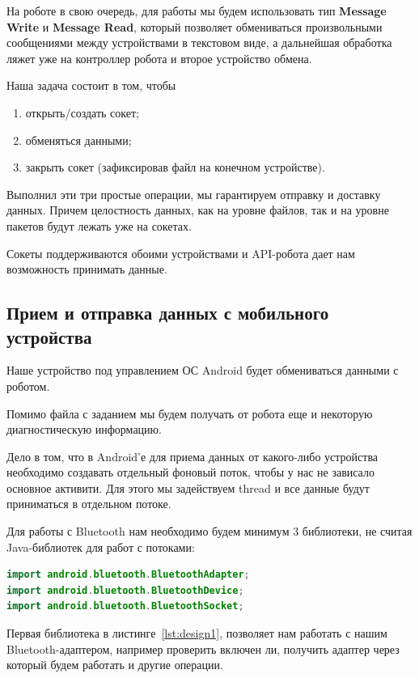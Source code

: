 На роботе в свою очередь, для работы мы будем использовать тип \textbf{Message Write} и \textbf{Message Read}, который позволяет обмениваться произвольными сообщениями между устройствами в текстовом виде, а дальнейшая обработка ляжет уже на контроллер робота и второе устройство обмена.

Наша задача состоит в том, чтобы 
\begin{enumerate}
  \item открыть/создать сокет;
  \item обменяться данными;
  \item закрыть сокет (зафиксировав файл на конечном устройстве).
\end{enumerate}

Выполнил эти три простые операции, мы гарантируем отправку и доставку данных. Причем целостность данных, как на уровне файлов, так и на уровне пакетов будут лежать уже на сокетах.

Сокеты поддерживаются обоими устройствами и API-робота дает нам возможность принимать данные.

\subsection{Прием и отправка данных с мобильного устройства}

Наше устройство под управлением ОС Android будет обмениваться данными с роботом.

Помимо файла с заданием мы будем получать от робота еще и некоторую диагностическую информацию.

Дело в том, что в Android'е для приема данных от какого-либо устройства необходимо создавать отдельный фоновый поток, чтобы у нас не зависало основное активити. Для этого мы задействуем thread и все данные будут приниматься в отдельном потоке.

Для работы с Bluetooth нам необходимо будем минимум 3 библиотеки, не считая Java-библиотек для работ с потоками:
\begin{lstlisting}[caption={Библиотеки для работы с Bluetooth на ОС Android}, label=lst:design2, language=Java]
import android.bluetooth.BluetoothAdapter;
import android.bluetooth.BluetoothDevice;
import android.bluetooth.BluetoothSocket;
\end{lstlisting}

Первая библиотека в листинге~\ref{lst:design1},  позволяет нам работать с нашим Bluetooth-адаптером, например проверить включен ли, получить адаптер через который будем работать и другие операции.

